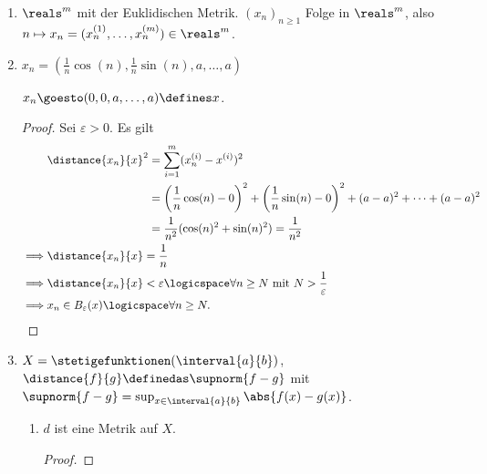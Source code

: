 \begin{beispiele}
    \begin{enumerate}
        \item \( \reals^m \) mit der Euklidischen Metrik. \( (x_n)_{n\geq 1} \) Folge in \( \reals^m \), also \( n\mapsto x_n=(x_n^{(1)},\ldots, x_n^{(m)})\in \reals^m \).
        \item \( x_n=\left( \frac{1}{n}\cos(n),\frac{1}{n}\sin(n),a,\ldots,a \right) \)
        \begin{behauptung*}
            \( x_n\goesto (0,0,a,\ldots,a)\defines x \).
        \end{behauptung*}
        \begin{proof}
            Sei \( \varepsilon>0 \). Es gilt
            \begin{align*}
                &\distance{x_n}{x}^2 \begin{aligned}[t] 
                    &=\sum\limits_{i=1}^{m} (x_n^{(i)}-x^{(i)})^2\\
                    &=\left( \frac{1}{n}\cos(n)-0 \right)^2+\left( \frac{1}{n}\sin(n)-0 \right)^2+(a-a)^2+\cdots +(a-a)^2\\
                    &=\frac{1}{n^2}(\cos(n)^2+\sin(n)^2)=\frac{1}{n^2}
                \end{aligned}\\
                \implies &\distance{x_n}{x}=\frac{1}{n}\\
                \implies &\distance{x_n}{x}<\varepsilon\logicspace\forall n\geq N\text{ mit } N>\frac{1}{\varepsilon}\\
                \implies &x_n \in B_\varepsilon(x) \logicspace\forall n \geq N.
            \end{align*}            
        \end{proof}
        
        \item \( X=\stetigefunktionen(\interval{a}{b}) \), \( \distance{f}{g}\definedas \supnorm{f-g} \) mit \( \supnorm{f-g}=\sup_{x\in \interval{a}{b}}\abs{f(x)-g(x)} \).
        \begin{enumerate}[label=\textbf{\arabic*. Beh}]
            \item \( d \) ist eine Metrik auf \( X \).
            \begin{proof}
\end{proof}
\end{enumerate}
\end{enumerate}
\end{beispiele}
